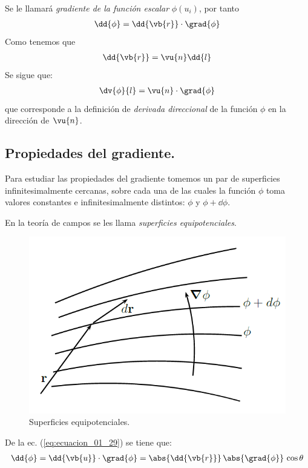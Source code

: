 Se le llamará \emph{gradiente de la función escalar} $\phi(u_{i})$, por tanto
\begin{align}
\dd{\phi} = \dd{\vb{r}} \cdot \grad{\phi}
\label{eq:ecuacion_01_29}
\end{align}
Como tenemos que
\begin{align*}
\dd{\vb{r}} = \vu{n} \dd{l}
\end{align*}
Se sigue que:
\begin{align*}
\dv{\phi}{l} = \vu{n} \cdot \grad{\phi}
\end{align*}
que corresponde a la definición de \emph{derivada direccional} de la función $\phi$ en la dirección de $\vu{n}$.
\subsection{Propiedades del gradiente.}
Para estudiar las propiedades del gradiente tomemos un par de superficies infinitesimalmente cercanas, sobre cada una de las cuales la función $\phi$ toma valores constantes e infinitesimalmente distintos: $\phi$ y $\phi + \dd{\phi}$.
\par
En la teoría de campos se les llama \emph{superficies equipotenciales}.
\begin{figure}[H]
    \centering
    \includegraphics[scale=0.5]{Imagenes/Superficies_Equipotenciales.png}
    \caption{Superficies equipotenciales.}
    \label{fig:Superficies_Equipotenciales}
\end{figure}
De la ec. (\ref{eq:ecuacion_01_29}) se tiene que:
\begin{align*}
\dd{\phi} = \dd{\vb{u}} \cdot \grad{\phi} = \abs{\dd{\vb{r}}} \, \abs{\grad{\phi}} \, \cos \theta
\end{align*}
